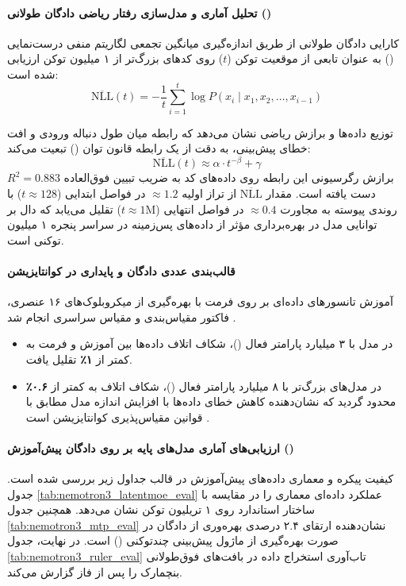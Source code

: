 \paragraph*{تحلیل آماری و مدل‌سازی رفتار ریاضی دادگان طولانی ()}
کارایی دادگان طولانی از طریق اندازه‌گیری میانگین تجمعی لگاریتم منفی درست‌نمایی () به عنوان تابعی از موقعیت توکن ($t$) روی کدهای بزرگ‌تر از ۱ میلیون توکن ارزیابی شده است:
\begin{equation}
    \overline{\text{NLL}}(t) = - \frac{1}{t} \sum_{i=1}^{t} \log P(x_i \mid x_1, x_2, \dots, x_{i-1})
\end{equation}

توزیع داده‌ها و برازش ریاضی نشان می‌دهد که رابطه میان طول دنباله ورودی و افت خطای پیش‌بینی، به دقت از یک رابطه قانون توان () تبعیت می‌کند:
\begin{equation}
    \overline{\text{NLL}}(t) \approx \alpha \cdot t^{-\beta} + \gamma
\end{equation}
برازش رگرسیونی این رابطه روی داده‌های کد به ضریب تبیین فوق‌العاده \textbf{$R^2 = 0.883$} دست یافته است. مقدار $\overline{\text{NLL}}$ از تراز اولیه $\approx 1.2$ در فواصل ابتدایی ($t \approx 128$) با روندی پیوسته به مجاورت $\approx 0.4$ در فواصل انتهایی ($t \approx 1\text{M}$) تقلیل می‌یابد که دال بر توانایی مدل در بهره‌برداری مؤثر از داده‌های پس‌زمینه در سراسر پنجره ۱ میلیون توکنی است.

\paragraph*{قالب‌بندی عددی دادگان و پایداری در کوانتایزیشن }
آموزش تانسورهای داده‌ای بر روی فرمت  با بهره‌گیری از میکروبلوک‌های ۱۶ عنصری، فاکتور مقیاس‌بندی  و مقیاس سراسری  انجام شد \cite{nvblackwell2025}. 
\begin{itemize}
    \item در مدل  با ۳ میلیارد پارامتر فعال ()، شکاف اتلاف داده‌ها بین آموزش  و فرمت  به کمتر از \textbf{۱٪} تقلیل یافت.
    \item در مدل‌های بزرگ‌تر با ۸ میلیارد پارامتر فعال ()، شکاف اتلاف به کمتر از \textbf{۰.۶٪} محدود گردید که نشان‌دهنده کاهش خطای داده‌ها با افزایش اندازه مدل مطابق با قوانین مقیاس‌پذیری کوانتایزیشن است \cite{chen2025scaling}.
\end{itemize}

\paragraph*{ارزیابی‌های آماری مدل‌های پایه بر روی دادگان پیش‌آموزش ()}
کیفیت پیکره و معماری داده‌های پیش‌آموزش در قالب جداول زیر بررسی شده است. جدول \ref{tab:nemotron3_latentmoe_eval} عملکرد داده‌ای معماری  را در مقایسه با ساختار استاندارد روی ۱ تریلیون توکن نشان می‌دهد. همچنین جدول \ref{tab:nemotron3_mtp_eval} نشان‌دهنده ارتقای ۲.۴ درصدی بهره‌وری از دادگان در صورت بهره‌گیری از ماژول پیش‌بینی چندتوکنی () \cite{gloeckle2024better} است. در نهایت، جدول \ref{tab:nemotron3_ruler_eval} تاب‌آوری استخراج داده در بافت‌های فوق‌طولانی بنچمارک  \cite{hsieh2024ruler} را پس از فاز  گزارش می‌کند.

